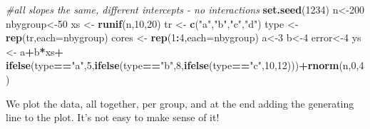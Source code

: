 \documentclass[
]{book}
\newenvironment{Shaded}{\begin{snugshade}}{\end{snugshade}}
\newcommand{\AttributeTok}[1]{\textcolor[rgb]{0.13,0.29,0.53}{#1}}
\newcommand{\CommentTok}[1]{\textcolor[rgb]{0.56,0.35,0.01}{\textit{#1}}}
\newcommand{\DecValTok}[1]{\textcolor[rgb]{0.00,0.00,0.81}{#1}}
\newcommand{\FunctionTok}[1]{\textcolor[rgb]{0.13,0.29,0.53}{\textbf{#1}}}
\newcommand{\NormalTok}[1]{#1}
\newcommand{\OtherTok}[1]{\textcolor[rgb]{0.56,0.35,0.01}{#1}}
\newcommand{\SpecialCharTok}[1]{\textcolor[rgb]{0.81,0.36,0.00}{\textbf{#1}}}
\newcommand{\StringTok}[1]{\textcolor[rgb]{0.31,0.60,0.02}{#1}}
\begin{document}
\begin{Shaded}
\begin{Highlighting}[]
\CommentTok{\#all slopes the same, different intercepts {-} no interactions}
\FunctionTok{set.seed}\NormalTok{(}\DecValTok{1234}\NormalTok{)}
\NormalTok{n}\OtherTok{\textless{}{-}}\DecValTok{200}
\NormalTok{nbygroup}\OtherTok{\textless{}{-}}\DecValTok{50}
\NormalTok{xs }\OtherTok{\textless{}{-}} \FunctionTok{runif}\NormalTok{(n,}\DecValTok{10}\NormalTok{,}\DecValTok{20}\NormalTok{)}
\NormalTok{tr }\OtherTok{\textless{}{-}} \FunctionTok{c}\NormalTok{(}\StringTok{"a"}\NormalTok{,}\StringTok{"b"}\NormalTok{,}\StringTok{"c"}\NormalTok{,}\StringTok{"d"}\NormalTok{)}
\NormalTok{type }\OtherTok{\textless{}{-}} \FunctionTok{rep}\NormalTok{(tr,}\AttributeTok{each=}\NormalTok{nbygroup)}
\NormalTok{cores }\OtherTok{\textless{}{-}} \FunctionTok{rep}\NormalTok{(}\DecValTok{1}\SpecialCharTok{:}\DecValTok{4}\NormalTok{,}\AttributeTok{each=}\NormalTok{nbygroup)}
\NormalTok{a}\OtherTok{\textless{}{-}}\DecValTok{3}
\NormalTok{b}\OtherTok{\textless{}{-}}\DecValTok{4}
\NormalTok{error}\OtherTok{\textless{}{-}}\DecValTok{4}
\NormalTok{ys }\OtherTok{\textless{}{-}}\NormalTok{ a}\SpecialCharTok{+}\NormalTok{b}\SpecialCharTok{*}\NormalTok{xs}\SpecialCharTok{+}
\FunctionTok{ifelse}\NormalTok{(type}\SpecialCharTok{==}\StringTok{"a"}\NormalTok{,}\DecValTok{5}\NormalTok{,}\FunctionTok{ifelse}\NormalTok{(type}\SpecialCharTok{==}\StringTok{"b"}\NormalTok{,}\DecValTok{8}\NormalTok{,}\FunctionTok{ifelse}\NormalTok{(type}\SpecialCharTok{==}\StringTok{"c"}\NormalTok{,}\DecValTok{10}\NormalTok{,}\DecValTok{12}\NormalTok{)))}\SpecialCharTok{+}\FunctionTok{rnorm}\NormalTok{(n,}\DecValTok{0}\NormalTok{,}\DecValTok{4}\NormalTok{)}
\end{Highlighting}
\end{Shaded}

We plot the data, all together, per group, and at the end adding the generating line to the plot. It's not easy to make sense of it!
\end{document}
